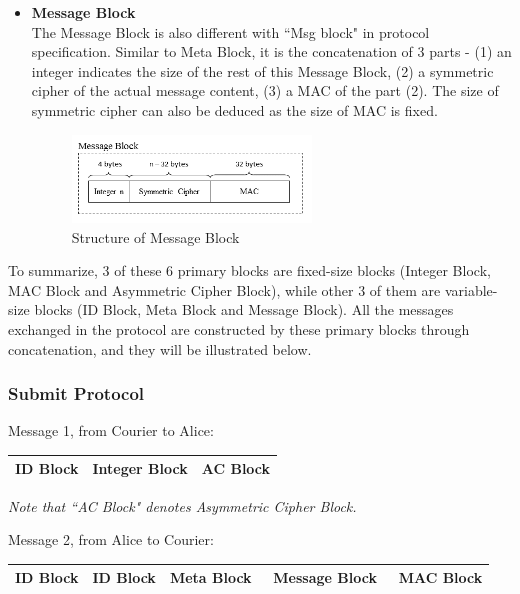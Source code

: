 \begin{itemize}
\item \textbf{Message Block} \\
The Message Block is also different with ``Msg block" in protocol specification. Similar to Meta Block, it is the concatenation of 3 parts - (1) an integer indicates the size of the rest of this Message Block, (2) a symmetric cipher of the actual message content, (3) a MAC of the part (2). The size of symmetric cipher can also be deduced as the size of MAC is fixed.

\begin{figure}[h!]
\centering
\includegraphics[width=0.6\textwidth,natwidth=456,natheight=168]{figures/messageblock.png}
\caption{Structure of Message Block}
\end{figure}
\end{itemize}

To summarize, 3 of these 6 primary blocks are fixed-size blocks (Integer Block, MAC Block and Asymmetric Cipher Block), while other 3 of them are variable-size blocks (ID Block, Meta Block and Message Block). All the messages exchanged in the protocol are constructed by these primary blocks through concatenation, and they will be illustrated below.

\subsubsection*{Submit Protocol}
Message 1, from Courier to Alice: \\
\begin{tabular}{|c|c|c|}
 \hline
 ID Block & Integer Block & \qquad\; AC Block \qquad\; \\ \hline
\end{tabular}

\noindent\bigskip
\textit{Note that ``AC Block" denotes Asymmetric Cipher Block.}

\noindent
Message 2, from Alice to Courier: \\\bigskip
\begin{tabular}{|c|c|c|c|c|}
 \hline
 ID Block & ID Block & \qquad\; Meta Block \qquad\; & 
 \quad\, Message Block \quad\, & MAC Block \\ \hline
\end{tabular}

